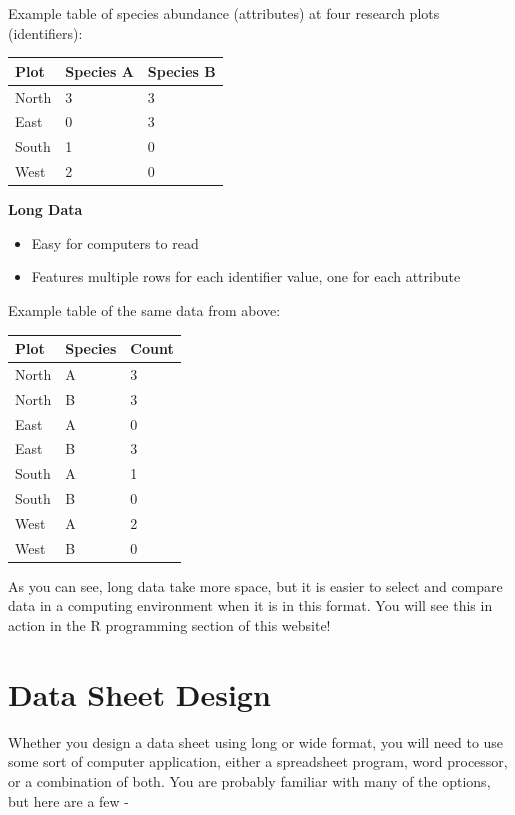 \documentclass[
  letterpaper,
  DIV=11,
  numbers=noendperiod]{scrreprt}
\begin{document}
Example table of species abundance (attributes) at four research plots
(identifiers):

\begin{longtable}[]{@{}lll@{}}
\toprule\noalign{}
Plot & Species A & Species B \\
\midrule\noalign{}
\endhead
\bottomrule\noalign{}
\endlastfoot
North & 3 & 3 \\
East & 0 & 3 \\
South & 1 & 0 \\
West & 2 & 0 \\
\end{longtable}

\textbf{Long Data}

\begin{itemize}
\item
  Easy for computers to read
\item
  Features multiple rows for each identifier value, one for each
  attribute
\end{itemize}

Example table of the same data from above:

\begin{longtable}[]{@{}lll@{}}
\toprule\noalign{}
Plot & Species & Count \\
\midrule\noalign{}
\endhead
\bottomrule\noalign{}
\endlastfoot
North & A & 3 \\
North & B & 3 \\
East & A & 0 \\
East & B & 3 \\
South & A & 1 \\
South & B & 0 \\
West & A & 2 \\
West & B & 0 \\
\end{longtable}

As you can see, long data take more space, but it is easier to select
and compare data in a computing environment when it is in this format.
You will see this in action in the R programming section of this
website!

\section{Data Sheet Design}\label{data-sheet-design}

Whether you design a data sheet using long or wide format, you will need
to use some sort of computer application, either a spreadsheet program,
word processor, or a combination of both. You are probably familiar with
many of the options, but here are a few -
\end{document}
